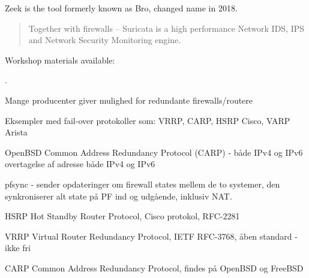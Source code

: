 \documentclass[Screen16to9,17pt]{foils}
\begin{document}
Zeek is the tool formerly known as Bro, changed name in 2018. 




\begin{quote}
Together with firewalls -- Suricata is a high performance Network IDS, IPS and Network Security Monitoring engine.
\end{quote}


Workshop materials available:\\
{\small{}}



.

\begin{list2}
\item Mange producenter giver mulighed for redundante firewalls/routere
\item Eksempler med fail-over protokoller som: VRRP, CARP, HSRP Cisco, VARP Arista
\item OpenBSD Common Address Redundancy Protocol (CARP) - både IPv4 og IPv6\\
overtagelse af adresse både IPv4 og IPv6
\item pfsync - sender opdateringer om firewall states mellem de to systemer, den synkroniserer alt state på PF ind og udgående, inklusiv NAT.
\end{list2}




\begin{list1}
\item HSRP Hot Standby Router Protocol, Cisco protokol, RFC-2281
\item VRRP Virtual Router Redundancy Protocol, IETF RFC-3768, åben standard - ikke fri
\item CARP Common Address Redundancy Protocol, findes på OpenBSD og FreeBSD
\item {}
\end{list1}


\slidenext
\end{document}
